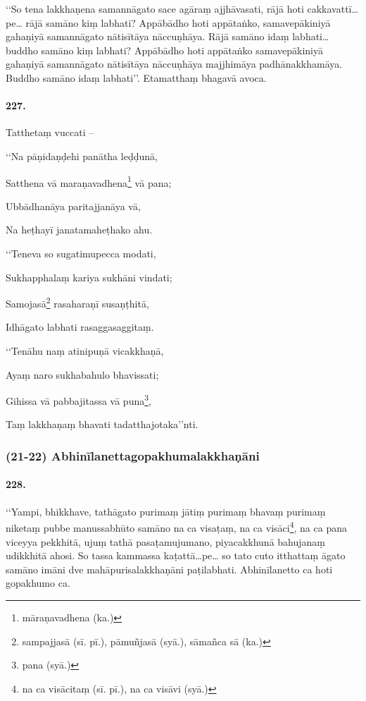 ‘‘So tena lakkhaṇena samannāgato sace agāraṃ ajjhāvasati, rājā hoti cakkavattī…pe… rājā samāno kiṃ labhati? Appābādho hoti appātaṅko, samavepākiniyā gahaṇiyā samannāgato nātisītāya nāccuṇhāya. Rājā samāno idaṃ labhati… buddho samāno kiṃ labhati? Appābādho hoti appātaṅko samavepākiniyā gahaṇiyā samannāgato nātisītāya nāccuṇhāya majjhimāya padhānakkhamāya. Buddho samāno idaṃ labhati’’. Etamatthaṃ bhagavā avoca.

\paragraph{227.} Tatthetaṃ vuccati –

‘‘Na pāṇidaṇḍehi panātha leḍḍunā,

Satthena vā maraṇavadhena\footnote{māraṇavadhena (ka.)} vā pana;

Ubbādhanāya paritajjanāya vā,

Na heṭhayī janatamaheṭhako ahu.

‘‘Teneva so sugatimupecca modati,

Sukhapphalaṃ kariya sukhāni vindati;

Samojasā\footnote{sampajjasā (sī. pī.), pāmuñjasā (syā.), sāmañca sā (ka.)} rasaharaṇī susaṇṭhitā,

Idhāgato labhati rasaggasaggitaṃ.

‘‘Tenāhu naṃ atinipuṇā vicakkhaṇā,

Ayaṃ naro sukhabahulo bhavissati;

Gihissa vā pabbajitassa vā puna\footnote{pana (syā.)},

Taṃ lakkhaṇaṃ bhavati tadatthajotaka’’nti.

\subsubsection{(21-22) Abhinīlanettagopakhumalakkhaṇāni}

\paragraph{228.} ‘‘Yampi, bhikkhave, tathāgato purimaṃ jātiṃ purimaṃ bhavaṃ purimaṃ niketaṃ pubbe manussabhūto samāno na ca visaṭaṃ, na ca visāci\footnote{na ca visācitaṃ (sī. pī.), na ca visāvi (syā.)}, na ca pana viceyya pekkhitā, ujuṃ tathā pasaṭamujumano, piyacakkhunā bahujanaṃ udikkhitā ahosi. So tassa kammassa kaṭattā…pe… so tato cuto itthattaṃ āgato samāno imāni dve mahāpurisalakkhaṇāni paṭilabhati. Abhinīlanetto ca hoti gopakhumo ca.

